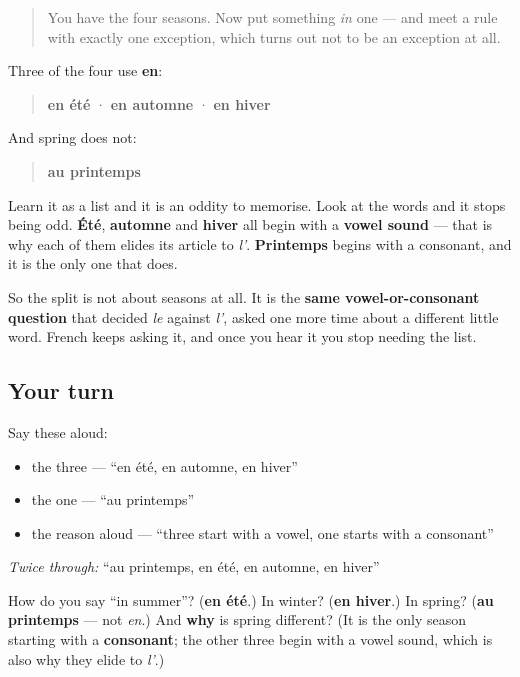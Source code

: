 \begin{quote}
You have the four seasons. Now put something \emph{in} one — and meet a rule with exactly one exception, which turns out not to be an exception at all.
\end{quote}

\begin{grammarlens}[title={Grammar Lens: three take en, one takes au}]
Three of the four use \textbf{en}:

\begin{quote}
\textbf{en été} · \textbf{en automne} · \textbf{en hiver}
\end{quote}

And spring does not:

\begin{quote}
\textbf{au printemps}
\end{quote}

Learn it as a list and it is an oddity to memorise. Look at the words and it stops being odd. \textbf{Été}, \textbf{automne} and \textbf{hiver} all begin with a \textbf{vowel sound} — that is why each of them elides its article to \emph{l'}. \textbf{Printemps} begins with a consonant, and it is the only one that does.

So the split is not about seasons at all. It is the \textbf{same vowel-or-consonant question} that decided \emph{le} against \emph{l'}, asked one more time about a different little word. French keeps asking it, and once you hear it you stop needing the list.
\end{grammarlens}

\subsection*{Your turn}
Say these aloud:

\begin{itemize}
\raggedright
  \item the three — \textquotedblleft{}en été, en automne, en hiver\textquotedblright{}
  \item the one — \textquotedblleft{}au printemps\textquotedblright{}
  \item the reason aloud — \textquotedblleft{}three start with a vowel, one starts with a consonant\textquotedblright{}
\end{itemize}

\emph{Twice through:} \textquotedblleft{}au printemps, en été, en automne, en hiver\textquotedblright{}

\begin{tcolorbox}[breakable,colback=teal!4,colframe=teal!35!black,title={Before you move on}]
How do you say \textquotedblleft{}in summer\textquotedblright{}? (\textbf{en été}.) In winter? (\textbf{en hiver}.) In spring? (\textbf{au printemps} — not \emph{en}.) And \textbf{why} is spring different? (It is the only season starting with a \textbf{consonant}; the other three begin with a vowel sound, which is also why they elide to \emph{l'}.)
\end{tcolorbox}
